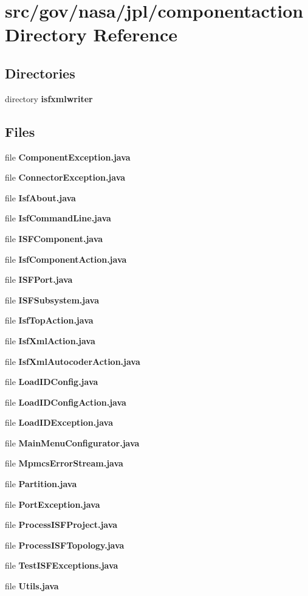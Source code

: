 \section{src/gov/nasa/jpl/componentaction Directory Reference}
\label{dir_a62d14eece2e0d685b2ff7d9aafd2e99}
\subsection*{Directories}
\begin{DoxyCompactItemize}
\item 
directory {\bf isfxmlwriter}
\end{DoxyCompactItemize}
\subsection*{Files}
\begin{DoxyCompactItemize}
\item 
file {\bf Component\+Exception.\+java}
\item 
file {\bf Connector\+Exception.\+java}
\item 
file {\bf Isf\+About.\+java}
\item 
file {\bf Isf\+Command\+Line.\+java}
\item 
file {\bf I\+S\+F\+Component.\+java}
\item 
file {\bf Isf\+Component\+Action.\+java}
\item 
file {\bf I\+S\+F\+Port.\+java}
\item 
file {\bf I\+S\+F\+Subsystem.\+java}
\item 
file {\bf Isf\+Top\+Action.\+java}
\item 
file {\bf Isf\+Xml\+Action.\+java}
\item 
file {\bf Isf\+Xml\+Autocoder\+Action.\+java}
\item 
file {\bf Load\+I\+D\+Config.\+java}
\item 
file {\bf Load\+I\+D\+Config\+Action.\+java}
\item 
file {\bf Load\+I\+D\+Exception.\+java}
\item 
file {\bf Main\+Menu\+Configurator.\+java}
\item 
file {\bf Mpmcs\+Error\+Stream.\+java}
\item 
file {\bf Partition.\+java}
\item 
file {\bf Port\+Exception.\+java}
\item 
file {\bf Process\+I\+S\+F\+Project.\+java}
\item 
file {\bf Process\+I\+S\+F\+Topology.\+java}
\item 
file {\bf Test\+I\+S\+F\+Exceptions.\+java}
\item 
file {\bf Utils.\+java}
\end{DoxyCompactItemize}
